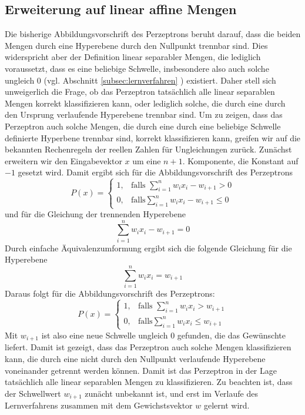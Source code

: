 \documentclass[fontsize=11pt]{scrartcl}
\begin{document}
            \subsection{Erweiterung auf linear affine Mengen}
                Die bisherige Abbildungsvorschrift des Perzeptrons beruht darauf, dass die beiden Mengen durch eine Hyperebene durch den Nullpunkt trennbar sind. Dies widerspricht aber der Definition linear separabler Mengen, die lediglich voraussetzt, dass es eine beliebige Schwelle, insbesondere also auch solche ungleich $0$ (vgl. Abschnitt \ref{subsec:lernverfahren} ) existiert. Daher stell sich unweigerlich die Frage, ob das Perzeptron tatsächlich alle linear separablen Mengen korrekt klassifizieren kann, oder lediglich solche, die durch eine durch den Ursprung verlaufende Hyperebene trennbar sind. Um zu zeigen, dass das Perzeptron auch solche Mengen, die durch eine durch eine beliebige Schwelle definierte Hyperbene trennbar sind, korrekt klassifizieren kann, greifen wir auf die bekannten Rechenregeln der reellen Zahlen für Ungleichungen zurück.
                Zunächst erweitern wir den Eingabevektor $x$ um eine $n+1$. Komponente, die Konstant auf $-1$ gesetzt wird.\cite{ertel2016}
                \newline 
                Damit ergibt sich für die Abbildungsvorschrift des Perzeptrons 
                $$
                    P(x)=\left\{\begin{array}{cl} 1, & \mbox{falls }\sum_{i=1}^nw_ix_i - w_{i+1} > 0\\ 0, & \mbox{falls} \sum_{i=1}^n w_ix_i - w_{i+1} \leq 0 \end{array}\right. 
                $$
                und für die Gleichung der trennenden Hyperebene
                $$
                    \sum_{i=1}^nw_ix_i - w_{i+1} = 0
                $$
                Durch einfache Äquivalenzumformung ergibt sich die folgende Gleichung für die Hyperebene
                    $$
                        \sum_{i=1}^nw_ix_i = w_{i+1}
                    $$
                    Daraus folgt für die Abbildungsvorschrift des Perzeptrons:
                    $$
                    P(x)=\left\{\begin{array}{cl} 1, & \mbox{falls }\sum_{i=1}^nw_ix_i > w_{i+1}\\ 0, & \mbox{falls} \sum_{i=1}^n w_ix_i \leq w_{i+1} \end{array}\right. 
                    $$
                    Mit $w_{i+1}$ ist also eine neue Schwelle ungleich $0$ gefunden, die das Gewünschte liefert. Damit ist gezeigt, dass das Perzeptron auch solche Mengen klassifizieren kann, die durch eine nicht durch den Nullpunkt verlaufende Hyperebene voneinander getrennt werden können. Damit ist das Perzeptron in der Lage tatsächlich alle linear separablen Mengen zu klassifizieren.
                    \newline
                    Zu beachten ist, dass der Schwellwert $w_{i+1}$ zunächt unbekannt ist, und erst im Verlaufe des Lernverfahrens zusammen mit dem Gewichstsvektor $w$ gelernt wird.\cite{ertel2016}
                
\end{document}
